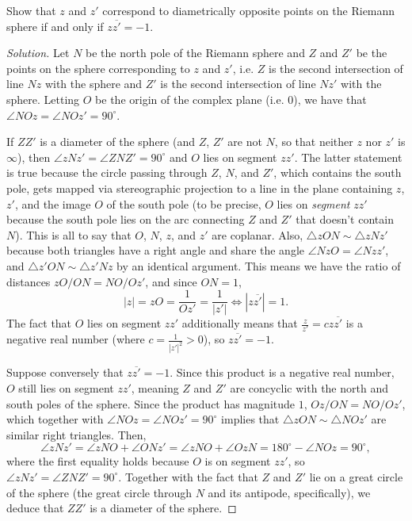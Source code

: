 \documentclass[10pt]{article}
\providecommand{\ol}{\overline}
\providecommand{\dg}{^\circ}
\newenvironment{soln}{\begin{proof}[Solution]}{\end{proof}}
\providecommand{\abs}[1]{\left\lvert #1\right\rvert}
\begin{document}
\begin{problem}
    [p.20\#1]
    Show that $z$ and $z'$ correspond to diametrically opposite points
    on the Riemann sphere if and only if $z\ol{z'} = -1$.
\end{problem}

\begin{soln}
    Let $N$ be the north pole of the Riemann sphere
    and $Z$ and $Z'$ be the points on the sphere
    corresponding to $z$ and $z'$, i.e.
    $Z$ is the second intersection of line $Nz$ with the sphere and
    $Z'$ is the second intersection of line $Nz'$ with the sphere.
    Letting $O$ be the origin of the complex plane (i.e. $0$),
    we have that $\angle NOz = \angle NOz' = 90\dg$.

    If $ZZ'$ is a diameter of the sphere (and $Z$, $Z'$ are not $N$,
    so that neither $z$ nor $z'$ is $\infty$),
    then $\angle zNz' = \angle ZNZ' = 90\dg$
    and $O$ lies on segment $zz'$. The latter statement is true because
    the circle passing through $Z$, $N$, and $Z'$,
    which contains the south pole, gets mapped
    via stereographic projection to a line in the plane containing $z$, $z'$,
    and the image $O$ of the south pole (to be precise,
    $O$ lies on \emph{segment} $zz'$ because the south pole
    lies on the arc connecting $Z$ and $Z'$ that doesn't contain $N$).
    This is all to say that $O$, $N$, $z$, and $z'$ are coplanar. Also,
    $\triangle zON\sim\triangle zNz'$ because both triangles have a right angle
    and share the angle $\angle NzO = \angle Nzz'$,
    and $\triangle z'ON\sim\triangle z'Nz$ by an identical argument.
    This means we have the ratio of distances $zO/ON = NO/Oz'$,
    and since $ON = 1$,
    \[
	\abs z = zO = \frac 1{Oz'} = \frac 1{|z'|}
	\iff |z\ol{z'}| = 1.
    \]
    The fact that $O$ lies on segment $zz'$ additionally means that
    $\frac z{z'} = cz\ol{z'}$ is a negative real number
    (where $c = \frac 1{\abs{z'}^2} > 0$), so $z\ol{z'} = -1$.

    Suppose conversely that $z\ol{z'} = -1$.
    Since this product is a negative real number, $O$ still lies on
    segment $zz'$, meaning $Z$ and $Z'$ are concyclic with
    the north and south poles of the sphere.
    Since the product has magnitude $1$, $Oz/ON = NO/Oz'$,
    which together with $\angle NOz = \angle NOz' = 90\dg$
    implies that $\triangle zON\sim\triangle NOz'$ are similar right triangles.
    Then,
    \begin{equation*}
        \angle zNz' = \angle zNO + \angle ONz'
	= \angle zNO + \angle OzN = 180\dg - \angle NOz = 90\dg,
    \end{equation*}
    where the first equality holds because $O$ is on segment $zz'$,
    so $\angle zNz' = \angle ZNZ' = 90\dg$.
    Together with the fact that $Z$ and $Z'$ lie on a great circle
    of the sphere (the great circle through $N$ and its antipode,
    specifically), we deduce that $ZZ'$ is a diameter of the sphere.
\end{soln}
\end{document}
